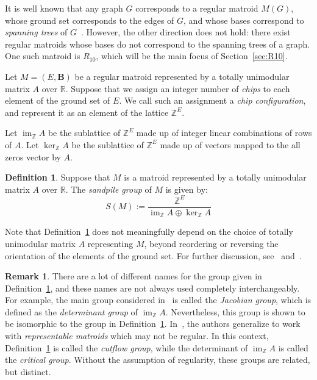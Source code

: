 \documentclass[12p]{amsart}
\numberwithin{equation}{section}
\theoremstyle{plain}
\theoremstyle{definition}
\newtheorem{defn}[thm]{Definition}
\newtheorem{remark}[thm]{Remark}
\newcommand{\Z}{\mathbb {Z}}
\newcommand{\mbf}{\mathbf}
\DeclareMathOperator{\im}{im}
\begin{document}
It is well known that any graph $G$ corresponds to a regular matroid $M(G)$, whose ground set corresponds to the edges of $G$, and whose bases correspond to \emph{spanning trees} of $G$~\cite[Section 5.1]{Oxley}. However, the other direction does not hold: there exist regular matroids whose bases do not correspond to the spanning trees of a graph. One such matroid is $R_{10}$, which will be the main focus of Section~\ref{sec:R10}. 

Let $M = (E,\mbf B)$ be a regular matroid represented by a totally unimodular matrix $A$ over $\mathbb R$. Suppose that we assign an integer number of \emph{chips} to each element of the ground set of $E$.  We call such an assignment a \emph{chip configuration}, and represent it as an element of the lattice $\Z^E$.

Let $\im_{\Z} A$ be the sublattice of $\Z^E$ made up of integer linear combinations of rows of $A$. Let $\ker_{\Z} A$ be the sublattice of $\Z^E$ made up of vectors mapped to the all zeros vector by $A$. 

\begin{defn}\label{def:sandpile}
    Suppose that $M$ is a matroid represented by a totally unimodular matrix $A$ over $\mathbb R$. The \emph{sandpile group} of $M$ is given by:
    \[S(M) := \frac{\Z^E}{\im_ {\Z} A\oplus \ker_ {\Z} A}\]
\end{defn}

Note that Definition~\ref{def:sandpile} does not meaningfully depend on the choice of totally unimodular matrix $A$ representing $M$, beyond reordering or reversing the orientation of the elements of the ground set. For further discussion, see~\cite[Section 2.1]{BBY} and~\cite{SuWagner}. 

\begin{remark}\label{rem:names}
    There are a lot of different names for the group given in Definition~\ref{def:sandpile}, and these names are not always used completely interchangeably. For example, the main group considered in~\cite{BBY} is called the \emph{Jacobian group}, which is defined as the \emph{determinant group} of $\im_ {\Z} A$. Nevertheless, this group is shown to be isomorphic to the group in Definition~\ref{def:sandpile}. In~\cite{CutsFlows}, the authors generalize to work with \emph{representable matroids} which may not be regular. In this context, Definition~\ref{def:sandpile} is called the \emph{cutflow group}, while the determinant of $\im_{\Z} A$ is called the \emph{critical group}. Without the assumption of regularity, these groups are related, but distinct. 
\end{remark}
\end{document}
